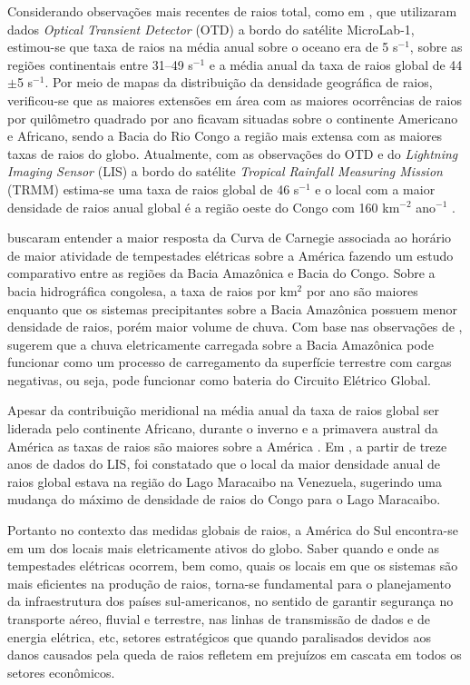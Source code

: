 Considerando observações mais recentes de raios total, como em \cite{christian2003global}, que utilizaram dados \textit{Optical Transient Detector} (OTD) a bordo do satélite MicroLab-1,  estimou-se que taxa de raios na média anual sobre o oceano era de 5 s$^{-1}$, sobre as regiões continentais entre 31--49 s$^{-1}$ e a  média anual da taxa de raios global de 44$\pm$5 s$^{-1}$. Por meio de mapas da distribuição da densidade geográfica de raios, verificou-se que as maiores extensões em área com as maiores ocorrências de raios por quilômetro quadrado por ano ficavam situadas sobre o continente Americano e Africano, sendo a Bacia do Rio Congo a região mais extensa com as maiores taxas de raios do globo. Atualmente, com as observações do OTD e do \textit{Lightning Imaging Sensor} (LIS) a bordo do satélite \textit{Tropical Rainfall Measuring Mission} (TRMM) estima-se uma taxa de raios global de 46 s$^{-1}$ e o local com a maior densidade de raios anual global é a região oeste do Congo com 160   km$^{-2}$ ano$^{-1}$ \cite{cecil2014gridded}.

 buscaram entender a maior resposta da Curva de Carnegie associada ao horário de maior atividade de tempestades elétricas sobre a América fazendo um estudo comparativo entre as regiões da Bacia Amazônica e Bacia do Congo. Sobre a bacia hidrográfica congolesa, a taxa de raios por km$^2$ por ano são maiores enquanto que os sistemas precipitantes sobre a Bacia Amazônica possuem menor densidade de raios, porém maior volume de chuva. Com base nas observações de ,  sugerem que a chuva eletricamente carregada sobre a Bacia Amazônica pode funcionar como um processo de carregamento da superfície terrestre com cargas negativas, ou seja, pode funcionar como bateria do Circuito Elétrico Global.

Apesar da contribuição meridional na média anual da taxa de raios global ser liderada pelo continente Africano, durante o inverno e a primavera austral da América as taxas de raios são maiores sobre a América \cite{christian2003global}. Em , a partir de treze anos de dados do LIS, foi constatado que o local da maior densidade anual de raios global estava na região do Lago Maracaibo na Venezuela, sugerindo  uma mudança do máximo de densidade de raios do Congo para o Lago Maracaibo.

Portanto no contexto das medidas globais de raios, a América do Sul encontra-se em um dos locais mais eletricamente ativos do globo. Saber quando e onde as tempestades elétricas ocorrem, bem como, quais os locais em que os sistemas são mais eficientes na produção de raios, torna-se fundamental para o planejamento da infraestrutura dos países sul-americanos, no sentido de garantir segurança no transporte aéreo, fluvial e terrestre, nas linhas de transmissão de dados e de energia elétrica, etc, setores estratégicos que quando paralisados devidos aos danos causados pela queda de raios refletem em prejuízos em cascata em todos os setores econômicos. 

